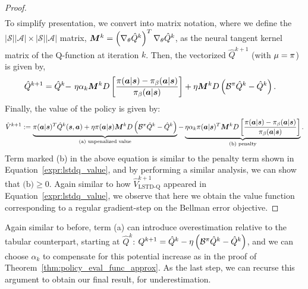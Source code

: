 \begin{proof}
\begin{align*}
\end{align*}
To simplify presentation, we convert into matrix notation, where we define the $|\mathcal{S}||\mathcal{A}| \times |\mathcal{S}||\mathcal{A}|$ matrix, $\boldsymbol{M}^k = \left(\nabla_\theta \hat{Q}^k\right)^T \nabla_\theta \hat{Q}^k$, as the neural tangent kernel matrix of the Q-function at iteration $k$. Then, the vectorized $\hat{Q}^{k+1}$ (with $\mu = \pi$) is given by,
\begin{align*}
    \hat{Q}^{k+1} = \hat{Q}^{k} -&~ \eta \alpha_k \boldsymbol{M}^k D \left[ \frac{\pi(\boldsymbol{a}|\boldsymbol{s}) - {\pi_\beta}(\boldsymbol{a}|\boldsymbol{s})}{{\pi_\beta}(\boldsymbol{a}|\boldsymbol{s})} \right] + \eta \boldsymbol{M}^k D \left(\mathcal{B}^\pi \hat{Q}^k - \hat{Q}^k \right).
\end{align*}
Finally, the value of the policy is given by:
\begin{equation}
    \hat{V}^{k+1} := \underbrace{\pi(\boldsymbol{a}|\boldsymbol{s})^T \hat{Q}^k(\boldsymbol{s}, \boldsymbol{a}) + \eta \pi(\boldsymbol{a}|\boldsymbol{s}) \boldsymbol{M}^k D \left(\mathcal{B}^\pi \hat{Q}^k - \hat{Q}^k \right)}_{\text{(a) unpenalized value}} - \underbrace{\eta \alpha_k \pi(\boldsymbol{a}|\boldsymbol{s})^T \boldsymbol{M}^k D \left[ \frac{\pi(\boldsymbol{a}|\boldsymbol{s}) - {\pi_\beta}(\boldsymbol{a}|\boldsymbol{s})}{{\pi_\beta}(\boldsymbol{a}|\boldsymbol{s})} \right]}_{\text{(b) penalty}}.
\end{equation}
Term marked (b) in the above equation is similar to the penalty term shown in Equation~\ref{expr:lstdq_value}, and by performing a similar analysis, we can show that $\text{(b)} \geq 0$. Again similar to how $\hat{V}^{k+1}_\text{LSTD-Q}$ appeared in Equation~\ref{expr:lstdq_value}, we observe that here we obtain the value function corresponding to a regular gradient-step on the Bellman error objective. 
\end{proof}

Again similar to before, term (a) can introduce overestimation relative to the tabular counterpart, starting at $\hat{Q}^k$: $Q^{k+1} = \hat{Q}^k - \eta \left(\mathcal{B}^\pi \hat{Q}^k - \hat{Q}^k \right)$, and we can choose $\alpha_k$ to compensate for this potential increase as in the proof of Theorem~\ref{thm:policy_eval_func_approx}. As the last step, we can recurse this argument to obtain our final result, for underestimation.


